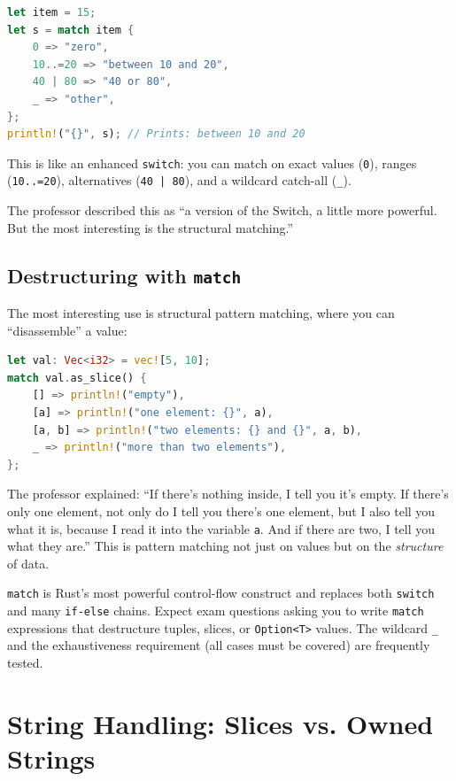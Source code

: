 \begin{lstlisting}[language=Rust]
let item = 15;
let s = match item {
    0 => "zero",
    10..=20 => "between 10 and 20",
    40 | 80 => "40 or 80",
    _ => "other",
};
println!("{}", s); // Prints: between 10 and 20
\end{lstlisting}

This is like an enhanced \texttt{switch}: you can match on exact values (\texttt{0}), ranges (\texttt{10..=20}), alternatives (\texttt{40 | 80}), and a wildcard catch-all (\texttt{\_}).

The professor described this as ``a version of the Switch, a little more powerful. But the most interesting is the structural matching.''

\subsection{Destructuring with \texttt{match}}

The most interesting use is structural pattern matching, where you can ``disassemble'' a value:

\begin{lstlisting}[language=Rust]
let val: Vec<i32> = vec![5, 10];
match val.as_slice() {
    [] => println!("empty"),
    [a] => println!("one element: {}", a),
    [a, b] => println!("two elements: {} and {}", a, b),
    _ => println!("more than two elements"),
};
\end{lstlisting}

The professor explained: ``If there's nothing inside, I tell you it's empty. If there's only one element, not only do I tell you there's one element, but I also tell you what it is, because I read it into the variable \texttt{a}. And if there are two, I tell you what they are.'' This is pattern matching not just on values but on the \emph{structure} of data.

\begin{exambox}
\texttt{match} is Rust's most powerful control-flow construct and replaces both \texttt{switch} and many \texttt{if-else} chains. Expect exam questions asking you to write \texttt{match} expressions that destructure tuples, slices, or \texttt{Option<T>} values. The wildcard \texttt{\_} and the exhaustiveness requirement (all cases must be covered) are frequently tested.
\end{exambox}

\section{String Handling: Slices vs. Owned Strings}

